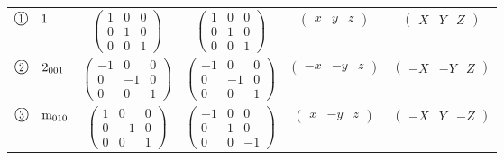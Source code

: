 \documentclass[fleqn,10pt,landscape]{jsarticle}
\begin{document}
\begin{center}
\begin{longtable}{lcccc}
$ {\ooalign{\hfil\resizebox{.8\width}{\height}{1}\hfil\crcr\raise.1ex\hbox{\large$\bigcirc$}}}\quad 1 $ & $ \begin{pmatrix} 1 & 0 & 0 \\ 0 & 1 & 0 \\ 0 & 0 & 1 \end{pmatrix} $ & $ \begin{pmatrix} 1 & 0 & 0 \\ 0 & 1 & 0 \\ 0 & 0 & 1 \end{pmatrix} $ & $ \begin{pmatrix} x & y & z \end{pmatrix} $ & $ \begin{pmatrix} X & Y & Z \end{pmatrix} $ \\
$ {\ooalign{\hfil\resizebox{.8\width}{\height}{2}\hfil\crcr\raise.1ex\hbox{\large$\bigcirc$}}}\quad 2{}_{001} $ & $ \begin{pmatrix} -1 & 0 & 0 \\ 0 & -1 & 0 \\ 0 & 0 & 1 \end{pmatrix} $ & $ \begin{pmatrix} -1 & 0 & 0 \\ 0 & -1 & 0 \\ 0 & 0 & 1 \end{pmatrix} $ & $ \begin{pmatrix} - x & - y & z \end{pmatrix} $ & $ \begin{pmatrix} - X & - Y & Z \end{pmatrix} $ \\
$ {\ooalign{\hfil\resizebox{.8\width}{\height}{3}\hfil\crcr\raise.1ex\hbox{\large$\bigcirc$}}}\quad {\rm m}_{010} $ & $ \begin{pmatrix} 1 & 0 & 0 \\ 0 & -1 & 0 \\ 0 & 0 & 1 \end{pmatrix} $ & $ \begin{pmatrix} -1 & 0 & 0 \\ 0 & 1 & 0 \\ 0 & 0 & -1 \end{pmatrix} $ & $ \begin{pmatrix} x & - y & z \end{pmatrix} $ & $ \begin{pmatrix} - X & Y & - Z \end{pmatrix} $ \\

\end{longtable}
\end{center}
\end{document}
